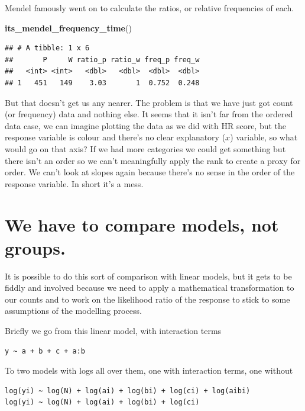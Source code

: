 \documentclass[
]{book}
\newenvironment{Shaded}{\begin{snugshade}}{\end{snugshade}}
\newcommand{\KeywordTok}[1]{\textcolor[rgb]{0.13,0.29,0.53}{\textbf{#1}}}
\newcommand{\NormalTok}[1]{#1}
\begin{document}
Mendel famously went on to calculate the ratios, or relative frequencies of each.

\begin{Shaded}
\begin{Highlighting}[]
\KeywordTok{its_mendel_frequency_time}\NormalTok{()}
\end{Highlighting}
\end{Shaded}

\begin{verbatim}
## # A tibble: 1 x 6
##       P     W ratio_p ratio_w freq_p freq_w
##   <int> <int>   <dbl>   <dbl>  <dbl>  <dbl>
## 1   451   149    3.03       1  0.752  0.248
\end{verbatim}

But that doesn't get us any nearer. The problem is that we have just got count (or frequency) data and nothing else. It seems that it isn't far from the ordered data case, we can imagine plotting the data as we did with HR score, but the response variable is colour and there's no clear explanatory (\(x\)) variable, so what would go on that axis? If we had more categories we could get something but there isn't an order so we can't meaningfully apply the rank to create a proxy for order. We can't look at slopes again because there's no sense in the order of the response variable. In short it's a mess.

\hypertarget{we-have-to-compare-models-not-groups.}{%
\section{We have to compare models, not groups.}\label{we-have-to-compare-models-not-groups.}}

It is possible to do this sort of comparison with linear models, but it gets to be fiddly and involved because we need to apply a mathematical transformation to our counts and to work on the likelihood ratio of the response to stick to some assumptions of the modelling process.

Briefly we go from this linear model, with interaction terms

\begin{verbatim}
y ~ a + b + c + a:b
\end{verbatim}

To two models with logs all over them, one with interaction terms, one without

\begin{verbatim}
log(yi) ~ log(N) + log(ai) + log(bi) + log(ci) + log(aibi)
log(yi) ~ log(N) + log(ai) + log(bi) + log(ci)
\end{verbatim}
\end{document}
